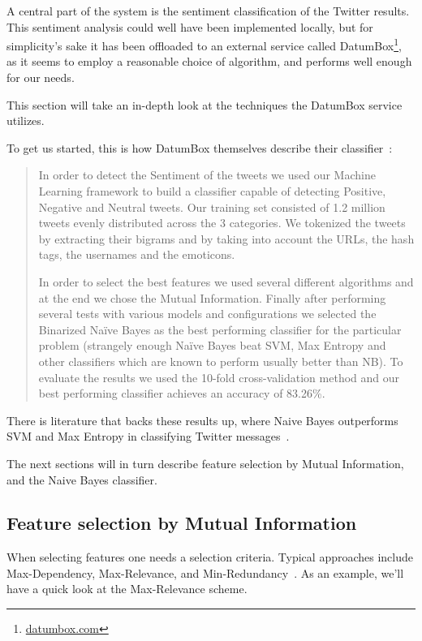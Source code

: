 A central part of the system is the sentiment classification of the Twitter results. This sentiment analysis could well have been implemented locally, but for simplicity's sake it has been offloaded to an external service called DatumBox\footnote{\url{datumbox.com}}, as it seems to employ a reasonable choice of algorithm, and performs well enough for our needs.

This section will take an in-depth look at the techniques the DatumBox service utilizes.

To get us started, this is how DatumBox themselves describe their classifier~\cite{DatumBoxTwitterSentiment}:

\begin{quote}
  In order to detect the Sentiment of the tweets we used our Machine Learning framework to build a classifier capable of detecting Positive, Negative and Neutral tweets. Our training set consisted of 1.2 million tweets evenly distributed across the 3 categories. We tokenized the tweets by extracting their bigrams and by taking into account the URLs, the hash tags, the usernames and the emoticons.

  In order to select the best features we used several different algorithms and at the end we chose the Mutual Information. Finally after performing several tests with various models and configurations we selected the Binarized Naïve Bayes as the best performing classifier for the particular problem (strangely enough Naïve Bayes beat SVM, Max Entropy and other classifiers which are known to perform usually better than NB). To evaluate the results we used the 10-fold cross-validation method and our best performing classifier achieves an accuracy of 83.26\%.
\end{quote}

There is literature that backs these results up, where Naive Bayes outperforms SVM and Max Entropy in classifying Twitter messages~\cite{go2009twitter}.

The next sections will in turn describe feature selection by Mutual Information, and the Naive Bayes classifier.

\subsection{Feature selection by Mutual Information} %
\label{sub:feature_selection_by_mutual_information}

When selecting features one needs a selection criteria. Typical approaches include Max-Dependency, Max-Relevance, and Min-Redundancy~\cite{1453511}. As an example, we'll have a quick look at the Max-Relevance scheme.

